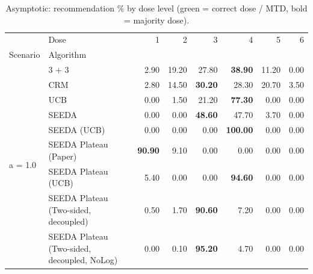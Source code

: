 \begin{table}[H]
\centering
\caption{Asymptotic: recommendation \% by dose level (green = correct dose / MTD, bold = majority dose).}
\label{tab:asym_rec_by_dose}
\begin{tabular}{llrrrrrr}
\toprule
 & Dose & 1 & 2 & 3 & 4 & 5 & 6 \\
Scenario & Algorithm &  &  &  &  &  &  \\
\midrule
\multirow[c]{9}{*}{a = 1.0} & 3 + 3 & 2.90 & 19.20 & {\cellcolor[HTML]{C8E6C9}} 27.80 & \bfseries 38.90 & 11.20 & 0.00 \\
 & CRM & 2.80 & 14.50 & {\cellcolor[HTML]{C8E6C9}} \bfseries 30.20 & 28.30 & 20.70 & 3.50 \\
 & UCB & 0.00 & 1.50 & {\cellcolor[HTML]{C8E6C9}} 21.20 & \bfseries 77.30 & 0.00 & 0.00 \\
 & SEEDA & 0.00 & 0.00 & {\cellcolor[HTML]{C8E6C9}} \bfseries 48.60 & 47.70 & 3.70 & 0.00 \\
 & SEEDA (UCB) & 0.00 & 0.00 & {\cellcolor[HTML]{C8E6C9}} 0.00 & \bfseries 100.00 & 0.00 & 0.00 \\
 & SEEDA Plateau (Paper) & \bfseries 90.90 & 9.10 & {\cellcolor[HTML]{C8E6C9}} 0.00 & 0.00 & 0.00 & 0.00 \\
 & SEEDA Plateau (UCB) & 5.40 & 0.00 & {\cellcolor[HTML]{C8E6C9}} 0.00 & \bfseries 94.60 & 0.00 & 0.00 \\
 & SEEDA Plateau (Two-sided, decoupled) & 0.50 & 1.70 & {\cellcolor[HTML]{C8E6C9}} \bfseries 90.60 & 7.20 & 0.00 & 0.00 \\
 & SEEDA Plateau (Two-sided, decoupled, NoLog) & 0.00 & 0.10 & {\cellcolor[HTML]{C8E6C9}} \bfseries 95.20 & 4.70 & 0.00 & 0.00 \\
\bottomrule
\end{tabular}
\end{table}
